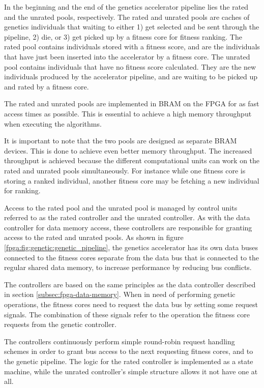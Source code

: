 In the beginning and the end of the genetics accelerator pipeline lies the rated and the unrated pools, respectively.
The rated and unrated pools are caches of genetics individuals that waiting to either 1) get selected and be sent through the pipeline, 2) die, or 3) get picked up by a fitness core for fitness ranking.
The rated pool contains individuals stored with a fitness score, and are the individuals that have just been inserted into the accelerator by a fitness core.
The unrated pool contains individuals that have no fitness score calculated.
They are the new individuals produced by the accelerator pipeline, and are waiting to be picked up and rated by a fitness core.

The rated and unrated pools are implemented in \gls{BRAM} on the FPGA for as fast access times as possible.
This is essential to achieve a high memory throughput when executing the algorithms.

It is important to note that the two pools are designed as separate \gls{BRAM} devices.
This is done to achieve even better memory throughput.
The increased throughput is achieved because the different computational units can work on the rated and unrated pools simultaneously.
For instance while one fitness core is storing a ranked individual, another fitness core may be fetching a new individual for ranking. 

Access to the \gls{rated pool} and the \gls{unrated pool} is managed by control units referred to as the \gls{rated controller} and the \gls{unrated controller}.
As with the \gls{data controller} for data memory access, these controllers are responsible for granting access to the rated and unrated pools.
As shown in figure \vref{fpga:fig:genetic:genetic_pipeline}, the genetics accelerator has its own data buses connected to the fitness cores separate from the data bus that is connected to the regular shared data memory, to increase performance by reducing bus conflicts.

The controllers are based on the same principles as the \gls{data controller} described in section \vref{subsec:fpga-data-memory}.
When in need of performing genetic operations, the fitness cores need to request the data bus by setting some request signals.
The combination of these signals refer to the operation the fitness core requests from the genetic controller. 

The controllers continuously perform simple round-robin request handling schemes in order to grant bus access to the next requesting fitness cores, and to the genetic pipeline.
The logic for the \gls{rated controller} is implemented as a state machine, while the \gls{unrated controller}'s simple structure allows it not have one at all.

